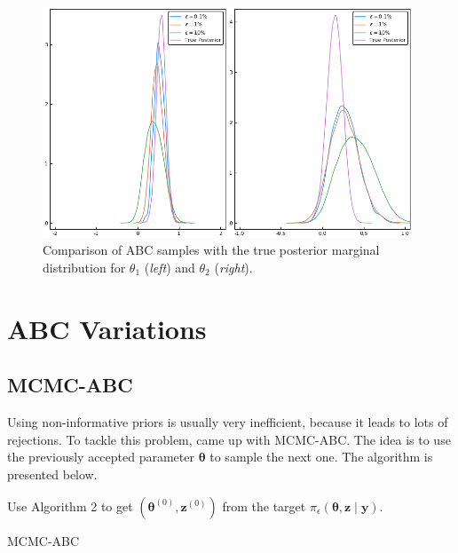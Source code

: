 \documentclass[runningheads]{llncs}
\begin{document}
    \begin{figure}[H]
        \centering
        \includegraphics[width=11cm]{images/ABCmodel1_Marginal.png}
        \caption{Comparison of ABC samples with the true posterior
        marginal distribution for $\theta_1$ (\textit{left}) and
        $\theta_2$ (\textit{right}).
        }
        \label{fig:calibration2}
    \end{figure}

\section{ABC Variations}
\subsection{MCMC-ABC}
\label{subsec:statistical-summaries}

Using non-informative priors is usually very inefficient,
because it leads to lots of rejections. To tackle this
problem, \citet{Marjoram2013} came up with MCMC-ABC.
The idea is to use the previously accepted parameter $\bm \theta$
to sample the next one. The algorithm is presented below.

\hfill\break
\begin{algorithm}[H]
\SetAlgoLined
Use Algorithm 2 to get $(\bm \theta^{(0)}, \bm z^{(0)})$ from the
target $\pi_\epsilon(\bm \theta, \bm z \mid \bm y)$.

 \caption{MCMC-ABC}
\end{algorithm}
\hfill\break
\end{document}
